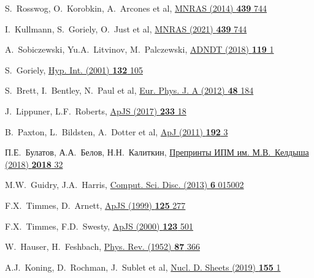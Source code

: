 \begin{thebibliography}{9}
S.~Rosswog, O.~Korobkin, A.~Arcones et al,
\href{https://doi.org/10.1093/mnras/stt2502}
  {MNRAS (2014) \textbf{439} 744}

I.~Kullmann, S.~Goriely, O.~Just et al,
\href{https://doi.org/10.1093/mnras/stab3393}
  {MNRAS (2021) \textbf{439} 744}

A.~Sobiczewski, Yu.A.~Litvinov, M.~Palczewski, 
\href{https://doi.org/10.1016/j.adt.2017.05.001}
  {ADNDT (2018) \textbf{119} 1}

S.~Goriely,
\href{http://dx.doi.org/10.1023/A:1011929318210}
  {Hyp. Int. (2001) \textbf{132} 105}

S.~Brett, I.~Bentley, N.~Paul et al,
\href{https://doi.org/10.1140/epja/i2012-12184-4}
  {Eur. Phys. J. A (2012) \textbf{48} 184}

J.~Lippuner, L.F.~Roberts, 
\href{https://doi.org/10.3847/1538-4365/aa94cb}
  {ApJS (2017) \textbf{233} 18}

B.~Paxton, L.~Bildsten, A.~Dotter et al,
\href{https://doi.org/10.1088/0067-0049/192/1/3}
  {ApJ (2011) \textbf{192} 3}

П.Е.~Булатов, А.А.~Белов, Н.Н.~Калиткин,
\href{https://doi.org/10.20948/prepr-2018-173}
  {Препринты ИПМ им. М.В.~Келдыша (2018) \textbf{2018} 32}

M.W.~Guidry, J.A.~Harris,
\href{https://doi.org/10.1088/1749-4699/6/1/015003}
  {Comput. Sci. Disc. (2013) \textbf{6} 015002}

F.X.~Timmes, D.~Arnett,
\href{http://doi.org/10.1086/313271}
  {ApJS (1999) \textbf{125} 277}

F.X.~Timmes, F.D.~Swesty,
\href{http://doi.org/10.1086/313304}
  {ApJS (2000) \textbf{123} 501}

W.~Hauser, H.~Feshbach,
\href{http://link.aps.org/doi/10.1103/PhysRev.87.366.}
  {Phys. Rev. (1952) \textbf{87} 366}

A.J.~Koning, D.~Rochman, J.~Sublet et al,
\href{https://doi.org/10.1016/j.nds.2019.01.002}
  {Nucl. D. Sheets (2019) \textbf{155} 1}


\end{thebibliography}
